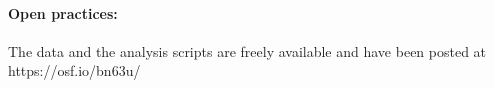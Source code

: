 \documentclass[a4paper,man,natbib]{apa6}
\begin{document}
\begin{linenumbers}


\paragraph*{Open practices:}
The data and the analysis scripts are freely available and have been posted at https://osf.io/bn63u/








\end{linenumbers}
\end{document}
